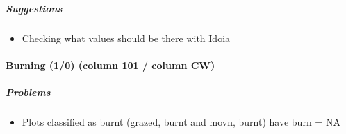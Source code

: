 \documentclass[table]{article}
\providecommand{\tightlist}{%
  \setlength{\itemsep}{0pt}\setlength{\parskip}{0pt}}
\let\oldparagraph\paragraph
\renewcommand{\paragraph}[1]{\oldparagraph{#1}\mbox{}}
\let\oldsubparagraph\subparagraph
\renewcommand{\subparagraph}[1]{\oldsubparagraph{#1}\mbox{}}
\begin{document}
\subparagraph{\texorpdfstring{\emph{Suggestions}}{Suggestions}}\label{suggestions-5}

\begin{itemize}
\tightlist
\item
  Checking what values should be there with Idoia
\end{itemize}

\paragraph{Burning (1/0) (column 101 / column
CW)}\label{burning-10-column-101-column-cw}

\subparagraph{\texorpdfstring{\emph{Problems}}{Problems}}\label{problems-6}

\begin{itemize}
\tightlist
\item
  Plots classified as burnt (grazed, burnt and movn, burnt) have burn =
  NA
\end{itemize}
\end{document}
